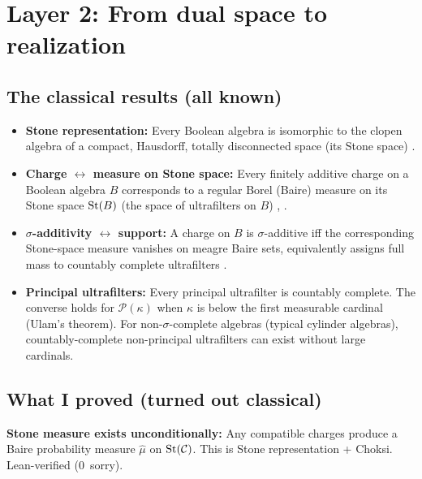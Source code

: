 \section{Layer 2: From dual space to realization}
\label{sec:realization}

\subsection{The classical results (all known)}

\begin{itemize}
  \item \textbf{Stone representation:} Every Boolean algebra is
    isomorphic to the clopen algebra of a compact, Hausdorff,
    totally disconnected space (its Stone space)
    \cite{Johnstone1982}.

  \item \textbf{Charge $\leftrightarrow$ measure on Stone space:}
    Every finitely additive charge on a Boolean algebra $B$
    corresponds to a regular Borel (Baire) measure on its Stone
    space $\mathrm{St}(B)$ (the space of ultrafilters on $B$)
    \cite[\S326]{Fremlin2003}, \cite[\S53]{Halmos1950}.

  \item \textbf{$\sigma$-additivity $\leftrightarrow$ support:}
    A charge on $B$ is $\sigma$-additive iff the corresponding
    Stone-space measure vanishes on meagre Baire sets, equivalently
    assigns full mass to countably complete ultrafilters
    \cite[Theorem~10.5.3]{RaoRao1983}.

  \item \textbf{Principal ultrafilters:} Every principal ultrafilter
    is countably complete.  The converse holds for $\mathcal{P}(\kappa)$
    when $\kappa$ is below the first measurable cardinal (Ulam's
    theorem).  For non-$\sigma$-complete algebras (typical cylinder
    algebras), countably-complete non-principal ultrafilters can
    exist without large cardinals.
\end{itemize}

\subsection{What I proved (turned out classical)}

\textbf{Stone measure exists unconditionally:} Any compatible
charges produce a Baire probability measure $\hat{\mu}$ on
$\mathrm{St}(\mathcal{C})$.  This is Stone representation + Choksi.
Lean-verified (0~sorry).

